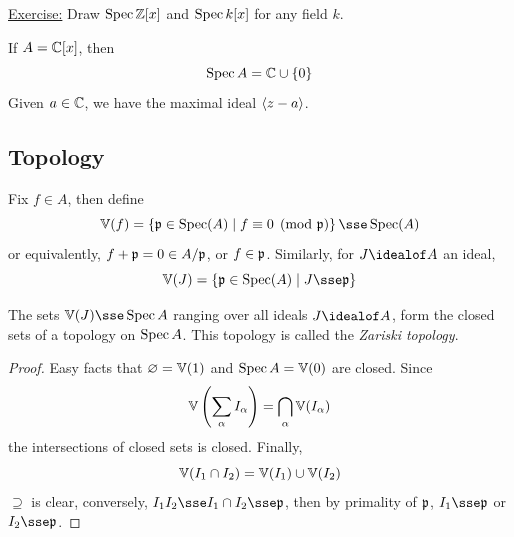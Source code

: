 \documentclass{article}
\begin{document}
\underline{Exercise:} Draw \(\operatorname{Spec} \mathbb{Z}[x] \) and \(\operatorname{Spec} k[x]\) for any field \(k\).

\begin{example}
     If \(A = \mathbb{C}[x]\), then
    \[\operatorname{Spec} A = \mathbb{C} \cup \{0\}\]
    Given \(a \in \mathbb{C}\), we have the maximal ideal \(\left\langle z-a \right\rangle\).
\end{example}

\subsection{Topology}

Fix \(f \in A\), then define
\[\van(f) = \left\{\mfp \in \Spec(A) \mid f \equiv 0 \pmod \mfp\right\} \sse \Spec(A)\]
or equivalently, \(f + \mathfrak{p} = 0 \in A/\mathfrak{p}\), or \(f \in \mathfrak{p}\). Similarly, for \(J \idealof A\) an ideal,
\[\van(J) = \left\{\mfp \in \Spec(A) \mid J \sse \mfp\right\}\]

\begin{proposition}
    The sets \(\van(J) \sse \Spec A\) ranging over all ideals \(J \idealof A\), form the closed sets of a topology on \(\operatorname{Spec} A\). This topology is called the \emph{Zariski topology}.
\end{proposition}

\begin{proof}
    Easy facts that \(\varnothing = \mathbb{V}(1)\) and \(\operatorname{Spec} A = \mathbb{V}(0)\) are closed. Since
    \[\mathbb{V}\left(\sum_\alpha I_\alpha\right) = \bigcap_\alpha \mathbb{V}(I_\alpha)\]
    the intersections of closed sets is closed. Finally,
    \[\mathbb{V}(I_1 \cap I_2) = \mathbb{V}(I_1) \cup \mathbb{V}(I_2)\]
    \(\supseteq\) is clear, conversely, \(I_1I_2 \sse I_1 \cap I_2 \sse \mfp\), then by primality of \(\mathfrak{p}\), \(I_1 \sse \mfp\) or \(I_2 \sse \mfp\).
\end{proof}
\end{document}
